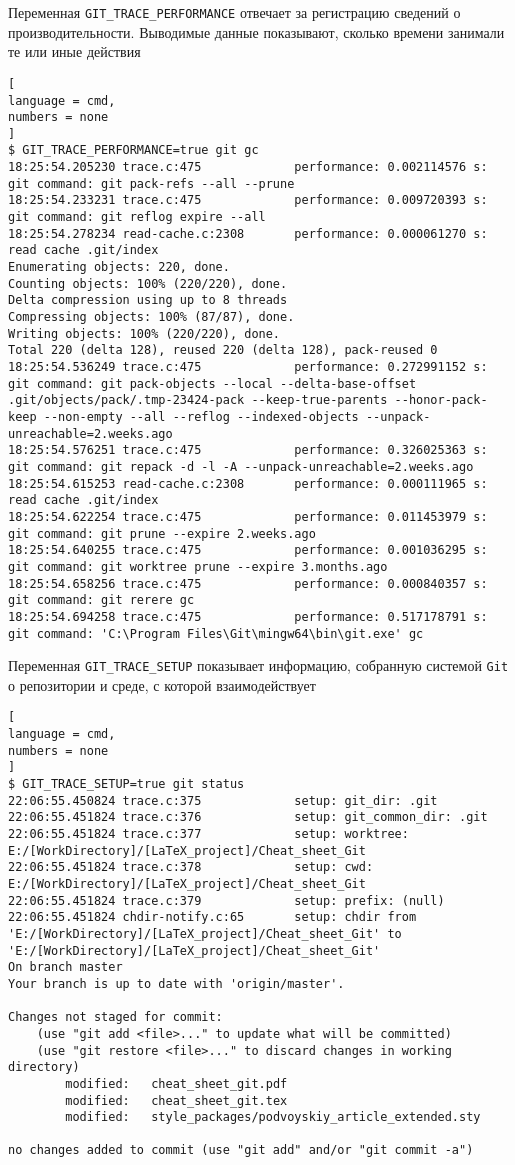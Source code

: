 \documentclass[%
	11pt,
	a4paper,
	utf8,
		]{article}
\begin{document}
Переменная \verb|GIT_TRACE_PERFORMANCE| отвечает за регистрацию сведений о производительности. Выводимые данные показывают, сколько времени занимали те или иные действия
\begin{lstlisting}[
language = cmd,
numbers = none
]
$ GIT_TRACE_PERFORMANCE=true git gc
18:25:54.205230 trace.c:475             performance: 0.002114576 s: git command: git pack-refs --all --prune
18:25:54.233231 trace.c:475             performance: 0.009720393 s: git command: git reflog expire --all
18:25:54.278234 read-cache.c:2308       performance: 0.000061270 s:  read cache .git/index
Enumerating objects: 220, done.
Counting objects: 100% (220/220), done.
Delta compression using up to 8 threads
Compressing objects: 100% (87/87), done.
Writing objects: 100% (220/220), done.
Total 220 (delta 128), reused 220 (delta 128), pack-reused 0
18:25:54.536249 trace.c:475             performance: 0.272991152 s: git command: git pack-objects --local --delta-base-offset .git/objects/pack/.tmp-23424-pack --keep-true-parents --honor-pack-keep --non-empty --all --reflog --indexed-objects --unpack-unreachable=2.weeks.ago
18:25:54.576251 trace.c:475             performance: 0.326025363 s: git command: git repack -d -l -A --unpack-unreachable=2.weeks.ago
18:25:54.615253 read-cache.c:2308       performance: 0.000111965 s:  read cache .git/index
18:25:54.622254 trace.c:475             performance: 0.011453979 s: git command: git prune --expire 2.weeks.ago
18:25:54.640255 trace.c:475             performance: 0.001036295 s: git command: git worktree prune --expire 3.months.ago
18:25:54.658256 trace.c:475             performance: 0.000840357 s: git command: git rerere gc
18:25:54.694258 trace.c:475             performance: 0.517178791 s: git command: 'C:\Program Files\Git\mingw64\bin\git.exe' gc
\end{lstlisting}

Переменная \verb|GIT_TRACE_SETUP| показывает информацию, собранную системой \texttt{Git} о репозитории и среде, с которой взаимодействует
\begin{lstlisting}[
language = cmd,
numbers = none
]
$ GIT_TRACE_SETUP=true git status
22:06:55.450824 trace.c:375             setup: git_dir: .git
22:06:55.451824 trace.c:376             setup: git_common_dir: .git
22:06:55.451824 trace.c:377             setup: worktree: E:/[WorkDirectory]/[LaTeX_project]/Cheat_sheet_Git
22:06:55.451824 trace.c:378             setup: cwd: E:/[WorkDirectory]/[LaTeX_project]/Cheat_sheet_Git
22:06:55.451824 trace.c:379             setup: prefix: (null)
22:06:55.451824 chdir-notify.c:65       setup: chdir from 'E:/[WorkDirectory]/[LaTeX_project]/Cheat_sheet_Git' to 'E:/[WorkDirectory]/[LaTeX_project]/Cheat_sheet_Git'
On branch master
Your branch is up to date with 'origin/master'.

Changes not staged for commit:
    (use "git add <file>..." to update what will be committed)
    (use "git restore <file>..." to discard changes in working directory)
        modified:   cheat_sheet_git.pdf
        modified:   cheat_sheet_git.tex
        modified:   style_packages/podvoyskiy_article_extended.sty

no changes added to commit (use "git add" and/or "git commit -a")
\end{lstlisting}
\end{document}
